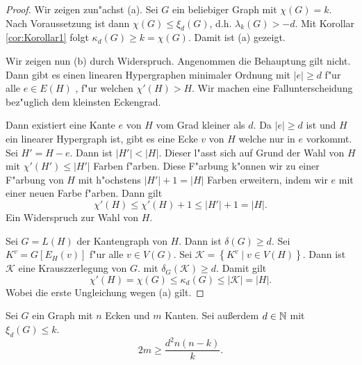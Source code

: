 \begin{proof}
  Wir zeigen zun"achst (a). Sei $G$ ein beliebiger Graph mit $\chi(G) = k$. Nach Voraussetzung ist dann $\chi(G) \leq \xi_{d}(G)$, d.h. $\lambda_{k}\left( G \right) > -d$. Mit Korollar \ref{cor:Korollar1} folgt $\kappa_{d}\left( G \right) \geq k = \chi\left( G \right)$. 
  Damit ist (a) gezeigt. 

  Wir zeigen nun (b) durch Widerspruch. Angenommen die Behauptung gilt nicht. Dann gibt es einen linearen Hypergraphen minimaler Ordnung mit $|e| \geq d$ f"ur alle $e\in E(H)$ , f"ur welchen $\chi'(H) > H$. 
  Wir machen eine Fallunterscheidung bez"uglich dem kleinsten Eckengrad.

   Dann existiert eine Kante $e$ von $H$ vom Grad kleiner als $d$. Da $|e| \geq d$ ist und $H$ ein linearer Hypergraph ist, gibt es eine Ecke $v$ von $H$ welche nur in $e$ vorkommt. Sei $H'= H-e$. Dann ist $|H'| < |H|$. Dieser l"asst sich auf Grund der Wahl von $H$ mit $\chi'(H') \leq |H'|$ Farben f"arben. Diese F"arbung k"onnen wir zu einer F"arbung von $H$ mit h"ochstens $|H'|+1 = |H|$ Farben erweitern, indem wir $e$ mit einer neuen Farbe f"arben. Dann gilt 
  $$\chi'(H) \leq \chi'(H) +1  \leq |H'| +1 = |H| .$$ 
  Ein Widerspruch zur Wahl von $H$. 

   Sei $G=L(H)$ der Kantengraph von $H$. Dann ist $\delta(G) \geq d$. Sei $K^{v} = G[E_{H}(v)]$ f"ur alle $v\in V(G)$. Sei $\mathcal{K}=\left\{ K^{v} \;|\; v \in V(H) \right\}$. Dann ist $\mathcal{K}$ eine Krauszzerlegung von $G$. mit $\delta_{G}(\mathcal{K}) \geq d$. Damit gilt
  \begin{equation*}
    \chi'(H) = \chi(G) \leq \kappa_{d}(G) \leq |\mathcal{K}| = |H|.
  \end{equation*}
  Wobei die erste Ungleichung wegen (a) gilt. 
\end{proof}

\begin{theorem}
  Sei $G$ ein Graph mit $n$ Ecken und $m$ Kanten. Sei au{\ss}erdem $d\in {\mathbb{N}}$ mit $\xi_d(G) \leq k$. 
$$ 2m \geq \frac{d^{2}n(n-k)}{k}.$$
  \label{thm:xikantenschranke}
\end{theorem}

